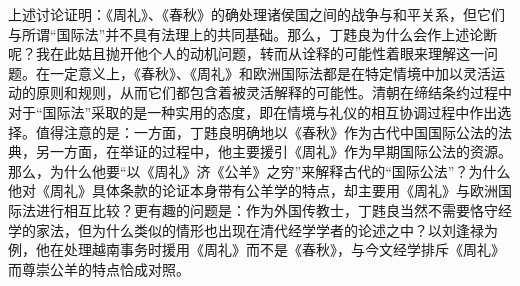 \documentclass[a4paper, 12pt, openright]{ctexbook}
\begin{document}
上述讨论证明：《周礼》、《春秋》的确处理诸侯国之间的战争与和平关系，但它们与所谓“国际法”并不具有法理上的共同基础。那么，丁韪良为什么会作上述论断呢？我在此姑且抛开他个人的动机问题，转而从诠释的可能性着眼来理解这一问题。在一定意义上，《春秋》、《周礼》和欧洲国际法都是在特定情境中加以灵活运动的原则和规则，从而它们都包含着被灵活解释的可能性。清朝在缔结条约过程中对于“国际法”采取的是一种实用的态度，即在情境与礼仪的相互协调过程中作出选择。值得注意的是：一方面，丁韪良明确地以《春秋》作为古代中国国际公法的法典，另一方面，在举证的过程中，他主要援引《周礼》作为早期国际公法的资源。那么，为什么他要“以《周礼》济《公羊》之穷”来解释古代的“国际公法”？为什么他对《周礼》具体条款的论证本身带有公羊学的特点，却主要用《周礼》与欧洲国际法进行相互比较？更有趣的问题是：作为外国传教士，丁韪良当然不需要恪守经学的家法，但为什么类似的情形也出现在清代经学学者的论述之中？以刘逢禄为例，他在处理越南事务时援用《周礼》而不是《春秋》，与今文经学排斥《周礼》而尊崇公羊的特点恰成对照。
\end{document}
